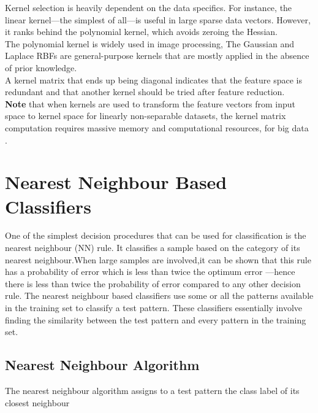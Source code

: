 Kernel selection is heavily dependent on the data specifics. For instance, the linear kernel—the simplest
of all—is useful in large sparse data vectors. However, it ranks behind the polynomial kernel, which avoids
zeroing the Hessian. \\The polynomial kernel is widely used in image processing, The Gaussian and Laplace RBFs are general-purpose kernels
that are mostly applied in the absence of prior knowledge. \\A kernel matrix that ends up being diagonal indicates that the feature space is redundant and that another kernel should be tried after feature reduction.\\

\textbf{
Note} that when kernels are used to transform the feature vectors from input space to kernel space for linearly non-separable datasets, the kernel matrix computation requires massive memory and computational
resources, for big data . 



\section{Nearest Neighbour Based Classifiers}

One of the simplest decision procedures that can be used for classification is the
nearest neighbour (NN) rule. It classifies a sample based on the category of its nearest
neighbour.When large samples are involved,it can be shown that this rule has a
probability of error which is less than twice the optimum error
—hence there is less
than twice the probability of error compared to any other decision rule. The nearest
neighbour based classifiers use some or all the patterns available in the training set
to classify a test pattern. These classifiers essentially involve finding the similarity
between the test pattern and every pattern in the training set.

\subsection{Nearest Neighbour Algorithm}
The nearest neighbour algorithm assigns to a test pattern the class label of its closest
neighbour


